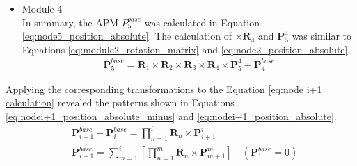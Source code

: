 \begin{itemize}
    \vspace{-15mm}
    \item Module 4 \\
    In summary, the APM $P_5^{base}$ was calculated in 
    Equation \ref{eq:node5_position_absolute}. The calculation of $\times\textbf{R}_{4}$ and $\textbf{P}_{5}^{4}$ 
    was similar to Equations \ref{eq:module2_rotation_matrix} and \ref{eq:node2_position_absolute}.
    \vspace{-5mm}
    \begin{align}
        \textbf{P}_{5}^{base} = \textbf{R}_{1} \times\textbf{R}_{2} \times\textbf{R}_{3} \times\textbf{R}_{4} 
        \times \textbf{P}_{5}^{4} + \textbf{P}_{4}^{base}
        \label{eq:node5_position_absolute}
    \end{align}
    \vspace{-15mm}
\end{itemize}
Applying the corresponding transformations to the Equation \ref{eq:node i+1 calculation} revealed the patterns shown 
in Equations \ref{eq:nodei+1_position_absolute_minus} and \ref{eq:nodei+1_position_absolute}.
\vspace{-5mm}
\begin{align}
    &\textbf{P}_{i+1}^{base} - \textbf{P}_{i}^{base} = \prod_{n=1}^{i}\textbf{R}_{n}\times \textbf{P}_{i+1}^{i} 
    \label{eq:nodei+1_position_absolute_minus} \\
    &\textbf{P}_{i+1}^{base} = \sum_{m=1}^{i}\left[\prod_{n=1}^{m}\textbf{R}_{n}\times \textbf{P}_{m+1}^{m}\right] \quad(\textbf{P}_{1}^{base} = 0)
    \label{eq:nodei+1_position_absolute}
\end{align}
\vspace{-5mm}
